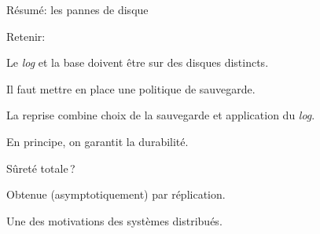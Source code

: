 \documentclass[aspectratio=169, handout]{beamer} %
\begin{document}
\begin{frame}{Résumé: les pannes de disque}

Retenir:

\vfill

\begin{redbullet}

  \item Le \textit{log} et la base doivent être sur des disques distincts.
  
  
  \item Il faut mettre en place une politique de sauvegarde.
 
 \item La reprise combine choix de la sauvegarde et application du \textit{log}.
 \end{redbullet}

\vfill

En principe, on \alert{garantit} la durabilité.
\vfill

\alert{Sûreté totale}\,? 

\begin{blocgauche}
\begin{redbullet}

  \item  Obtenue (asymptotiquement)
par \alert{réplication}. 

\item Une des motivations des systèmes distribués.
\end{redbullet}
\end{blocgauche}
\end{frame}
\end{document}
